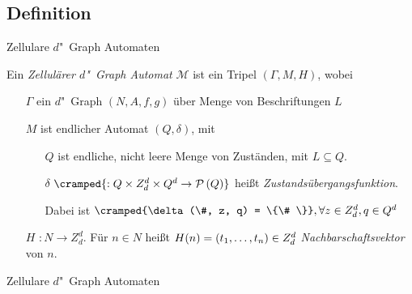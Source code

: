 \documentclass[18pt]{beamer}
\newcommand{\defWord}[1]{\emph{#1}}
\begin{document}
\subsection{Definition}
\begin{frame}{Zellulare $d$"~Graph Automaten}
	\begin{definition}
		Ein \defWord{Zellulärer $d$"~Graph Automat} $\mathcal{M}$ ist ein Tripel $\left(\Gamma, M, H\right)$, wobei
		\begin{itemize}
			\item[$\Gamma$] ein $d$"~Graph $\left(N, A, f, g\right)$ über Menge von Beschriftungen $L$
			\item[$M$]  ist endlicher Automat $\left(Q, \delta\right)$, mit 
			\begin{itemize}
				\item[$Q$] ist endliche, nicht leere Menge von Zuständen, mit $L \subseteq Q$.
				\item[$\delta$] $\cramped{: Q \times Z_d^d \times Q^d \rightarrow \mathcal{P}\left(Q\right)}$  heißt \defWord{Zustandsübergangsfunktion}.
				
				Dabei ist $\cramped{\delta(\#, z, q) = \{\# \}}, \forall z \in Z_d^d, q \in Q^d$
			\end{itemize}
			\item[$H$] $: N \rightarrow Z_d^d$. 
			Für $n \in N$ heißt $H(n) = \left(t_1, \text{\dots}, t_n\right) \in Z_d^d$ \defWord{Nachbarschaftsvektor} von $n$. 
		\end{itemize}
	\end{definition}
\end{frame}
\begin{frame}{Zellulare $d$"~Graph Automaten}
%		
\end{frame}


\end{document}
